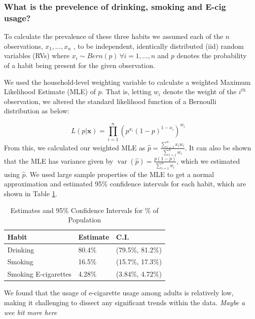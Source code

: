 \documentclass[
  11pt,
  twocolumn]{article}
\begin{document}
\subsubsection{What is the prevelence of drinking, smoking and E-cig
usage?}\label{what-is-the-prevelence-of-drinking-smoking-and-e-cig-usage}

To calculate the prevalence of these three habits we assumed each of the
\(n\) observations, \(x_1,…,x_n\) , to be independent, identically
distributed (iid) random variables (RVs) where
\(x_i \sim Bern(p)\, \forall i=1,…,n\) and \(p\) denotes the probability
of a habit being present for the given observation.

We used the household-level weighting variable to calculate a weighted
Maximum Likelihood Estimate (MLE) of \(p\). That is, letting \(w_i\)
denote the weight of the \(i^{th}\) observation, we altered the standard
likelihood function of a Bernoulli distribution as below:

\[L(p|\textbf{x}) = \prod_{i = 1}^{n} (p^{x_i}(1-p)^{1-x_i})^{w_i}\]
From this, we calculated our weighted MLE as
\(\widehat{p} = \frac{\sum_{i=1}^{n} x_iw_i}{\sum_{i=1}^{n} w_i}\). It
can also be shown that the MLE has variance given by
\(\mathop{\mathrm{var}}(\widehat{p})=\frac{p(1-p)}{\sum_{i=1}^{n}w_i}\),
which we estimated using \(\widehat{p}\). We used large sample
properties of the MLE to get a normal approximation and estimated 95\%
confidence intervals for each habit, which are shown in Table
\ref{tab:output-estimates-table}.

\begin{table}
\centering
\caption{\label{tab:outputestimatestable}Estimates and 95\% Confidence Intervals for \% of Population\label{tab:output-estimates-table}}
\centering
\fontsize{9}{11}\selectfont
\begin{tabular}[t]{l|l|l}
\hline
\textbf{Habit} & \textbf{Estimate} & \textbf{C.I.}\\
\hline
Drinking & 80.4\% & (79.5\%, 81.2\%)\\
\hline
Smoking & 16.5\% & (15.7\%, 17.3\%)\\
\hline
Smoking E-cigarettes & 4.28\% & (3.84\%, 4.72\%)\\
\hline
\end{tabular}
\end{table}

We found that the usage of e-cigarette usage among adults is relatively
low, making it challenging to dissect any significant trends within the
data. \emph{Maybe a wee bit more here}
\end{document}
